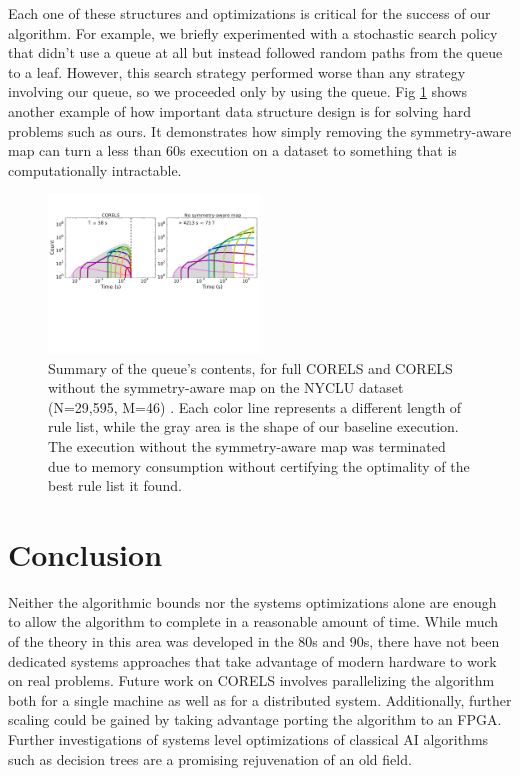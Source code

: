 \documentclass[format=sigconf]{acmart}
\begin{document}
Each one of these structures and optimizations is critical for the success of our algorithm.
For example, we briefly experimented with a stochastic search policy that didn't use a queue at all but instead followed random paths from the queue to a leaf.
However, this search strategy performed worse than any strategy involving our queue, so we proceeded only by using the queue.
Fig \ref{fig:ablation} shows another example of how important data structure design is for solving hard problems such as ours.
It demonstrates how simply removing the symmetry-aware map can turn a less than 60s execution on a dataset to something that is computationally intractable.

\begin{figure}[t!]
\begin{center}
\includegraphics[trim={0mm 0mm 0mm 1mm}, width=0.5\textwidth]{figs/sysml_ablation-queue.pdf}
\end{center}
\vspace{-5mm}
\caption{Summary of the queue's contents, for full CORELS and CORELS without the symmetry-aware map on the NYCLU dataset (N=29,595, M=46)  \citep{nyclu:2014}.
Each color line represents a different length of rule list, while the gray area is the shape of our baseline execution.
The execution without the symmetry-aware map was terminated due to memory consumption without certifying the optimality of the best rule list it found.
}
\label{fig:ablation}
\end{figure}

\section{Conclusion}
Neither the algorithmic bounds nor the systems optimizations alone are enough to allow the algorithm to complete in a reasonable amount of time.
While much of the theory in this area was developed in the 80s and 90s, there have not been dedicated systems approaches that take advantage of modern hardware to work on real problems.
Future work on CORELS involves parallelizing the algorithm both for a single machine as well as for a distributed system.
Additionally, further scaling could be gained by taking advantage porting the algorithm to an FPGA.
Further investigations of systems level optimizations of classical AI algorithms such as decision trees are a promising rejuvenation of an old field.



\end{document}
